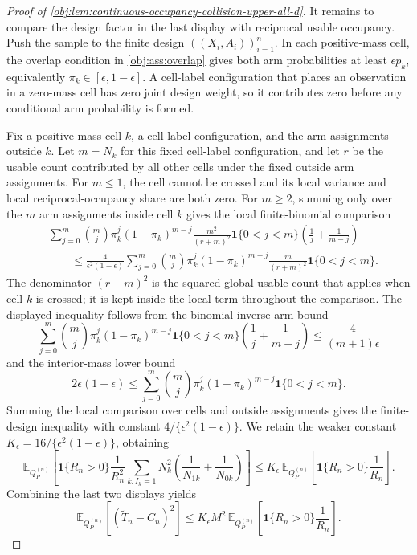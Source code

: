 \begin{proof}[Proof of \cref{obj:lem:continuous-occupancy-collision-upper-all-d}]
It remains to compare the design factor in the last display with reciprocal usable occupancy.  Push the sample to the finite design \(((X_i,A_i))_{i=1}^n\).  In each positive-mass cell, the overlap condition in \cref{obj:ass:overlap} gives both arm probabilities at least \(\epsilon p_k\), equivalently \(\pi_k\in[\epsilon,1-\epsilon]\).  A cell-label configuration that places an observation in a zero-mass cell has zero joint design weight, so it contributes zero before any conditional arm probability is formed.

Fix a positive-mass cell \(k\), a cell-label configuration, and the arm assignments outside \(k\).  Let \(m=N_k\) for this fixed cell-label configuration, and let \(r\) be the usable count contributed by all other cells under the fixed outside arm assignments.  For \(m\le1\), the cell cannot be crossed and its local variance and local reciprocal-occupancy share are both zero.  For \(m\ge2\), summing only over the \(m\) arm assignments inside cell \(k\) gives the local finite-binomial comparison
\[
\begin{aligned}
&\sum_{j=0}^{m}\binom{m}{j}\pi_k^j(1-\pi_k)^{m-j}
\frac{m^2}{(r+m)^2}
\mathbf 1\{0<j<m\}
\left(\frac1j+\frac1{m-j}\right) \\
&\qquad\le
\frac{4}{\epsilon^2(1-\epsilon)}
\sum_{j=0}^{m}\binom{m}{j}\pi_k^j(1-\pi_k)^{m-j}
\frac{m}{(r+m)^2}
\mathbf 1\{0<j<m\}.
\end{aligned}
\]
The denominator \((r+m)^2\) is the squared global usable count that applies when cell \(k\) is crossed; it is kept inside the local term throughout the comparison.  The displayed inequality follows from the binomial inverse-arm bound
\[
\sum_{j=0}^{m}\binom{m}{j}\pi_k^j(1-\pi_k)^{m-j}
\mathbf 1\{0<j<m\}
\left(\frac1j+\frac1{m-j}\right)
\le
\frac{4}{(m+1)\epsilon}
\]
and the interior-mass lower bound
\[
2\epsilon(1-\epsilon)
\le
\sum_{j=0}^{m}\binom{m}{j}\pi_k^j(1-\pi_k)^{m-j}
\mathbf 1\{0<j<m\}.
\]
Summing the local comparison over cells and outside assignments gives the finite-design inequality with constant \(4/\{\epsilon^2(1-\epsilon)\}\).  We retain the weaker constant \(K_\epsilon=16/\{\epsilon^2(1-\epsilon)\}\), obtaining
\[
\mathbb E_{Q_P^{(n)}}\!\left[
\mathbf 1\{R_n>0\}\frac1{R_n^2}
\sum_{k:I_k=1}N_k^2
\left(\frac1{N_{1k}}+\frac1{N_{0k}}\right)
\right]
\le
K_\epsilon\,
\mathbb E_{Q_P^{(n)}}\!\left[
\mathbf 1\{R_n>0\}\frac1{R_n}
\right].
\]
Combining the last two displays yields
\[
\mathbb E_{Q_P^{(n)}}\!\left[(\widetilde T_n-C_n)^2\right]
\le
K_\epsilon M^2\,
\mathbb E_{Q_P^{(n)}}\!\left[
\mathbf 1\{R_n>0\}\frac1{R_n}
\right].
\]


\end{proof}
